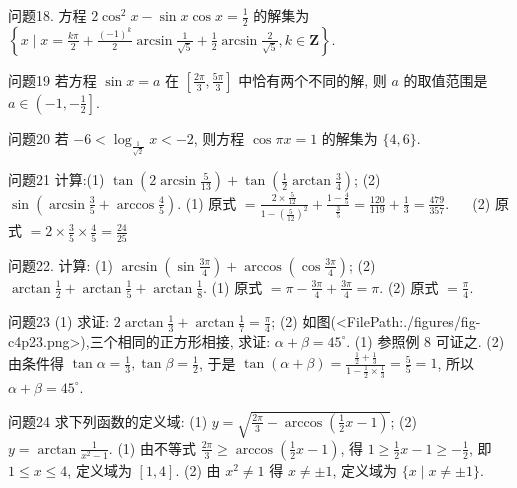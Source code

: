 问题18. 方程 $2 \cos ^2 x-\sin x \cos x=\frac{1}{2}$ 的解集为
$\left\{x \mid x=\frac{k \pi}{2}+\frac{(-1)^k}{2} \arcsin \frac{1}{\sqrt{5}}+\frac{1}{2} \arcsin \frac{2}{\sqrt{5}}, k \in \mathbf{Z}\right\}$.



问题19 若方程 $\sin x=a$ 在 $\left[\frac{2 \pi}{3}, \frac{5 \pi}{3}\right]$ 中恰有两个不同的解, 则 $a$ 的取值范围是
$a \in\left(-1,-\frac{1}{2}\right]$.



问题20 若 $-6<\log _{\frac{1}{\sqrt{2}}} x<-2$, 则方程 $\cos \pi x=1$ 的解集为
$\{4,6\}$.



问题21 计算:(1) $\tan \left(2 \arcsin \frac{5}{13}\right)+\tan \left(\frac{1}{2} \arctan \frac{3}{4}\right)$;
(2) $\sin \left(\arcsin \frac{3}{5}+\arccos \frac{4}{5}\right)$.
(1) 原式 $=\frac{2 \times \frac{5}{12}}{1-\left(\frac{5}{12}\right)^2}+\frac{1-\frac{4}{5}}{\frac{3}{5}}=\frac{120}{119}+\frac{1}{3}=\frac{479}{357}$. $\quad$ (2) 原式 $= 2 \times \frac{3}{5} \times \frac{4}{5}=\frac{24}{25}$



问题22. 计算: (1) $\arcsin \left(\sin \frac{3 \pi}{4}\right)+\arccos \left(\cos \frac{3 \pi}{4}\right)$;
(2) $\arctan \frac{1}{2}+\arctan \frac{1}{5}+\arctan \frac{1}{8}$.
(1) 原式 $=\pi-\frac{3 \pi}{4}+\frac{3 \pi}{4}=\pi$. (2) 原式 $=\frac{\pi}{4}$.



问题23 (1) 求证: $2 \arctan \frac{1}{3}+\arctan \frac{1}{7}=\frac{\pi}{4}$;
(2) 如图(<FilePath:./figures/fig-c4p23.png>),三个相同的正方形相接, 求证: $\alpha+\beta=45^{\circ}$.
(1) 参照例 8 可证之.
(2) 由条件得 $\tan \alpha=\frac{1}{3}, \tan \beta=\frac{1}{2}$, 于是 $\tan (\alpha+\beta)=\frac{\frac{1}{2}+\frac{1}{3}}{1-\frac{1}{2} \times \frac{1}{3}}=\frac{5}{5}=1$, 所以 $\alpha+\beta=45^{\circ}$.



问题24 求下列函数的定义域:
(1) $y=\sqrt{\frac{2 \pi}{3}-\arccos \left(\frac{1}{2} x-1\right)}$;
(2) $y=\arctan \frac{1}{x^2-1}$.
(1) 由不等式 $\frac{2 \pi}{3} \geqslant \arccos \left(\frac{1}{2} x-1\right)$, 得 $1 \geqslant \frac{1}{2} x-1 \geqslant-\frac{1}{2}$, 即 $1 \leqslant x \leqslant 4$, 定义域为 $[1,4]$. (2) 由 $x^2 \neq 1$ 得 $x \neq \pm 1$, 定义域为 $\{x \mid x \neq \pm 1\}$.



